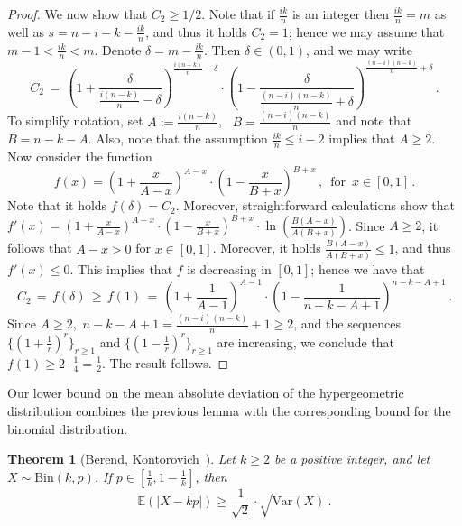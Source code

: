 \documentclass[10pt]{article}
\theoremstyle{plain}
\newtheorem{theorem}{Theorem}[section]
\theoremstyle{definition}
\theoremstyle{remark}
\newcommand{\Exp}{\mathbb{E}}
\begin{document}
\begin{proof}
We now show  that $C_2\ge 1/2$. 
Note that if $\frac{ik}{n}$ is an integer then    $\frac{ik}{n}=m$ 
as well as $s = n-i-k-\frac{ik}{n}$, and thus it holds  $C_2=1$; hence we may  assume that $m-1<\frac{ik}{n}<m$. Denote $\delta= m-\frac{ik}{n}$. Then $\delta\in (0,1)$, and we may write  
\[
C_2 \,=\, \left(1+\frac{\delta}{\frac{i(n-k)}{n}-\delta}\right)^{\frac{i(n-k)}{n}-\delta}\cdot\left(1-\frac{\delta}{\frac{(n-i)(n-k)}{n}+\delta}\right)^{\frac{(n-i)(n-k)}{n}+\delta} \, .
\]
To simplify notation,  set $A:=\frac{i(n-k)}{n}$, \, $B=\frac{(n-i)(n-k)}{n}$ and note that $B=n-k-A$. Also, note that the assumption $\frac{ik}{n}\le i-2$ implies that $A\ge 2$. 
Now consider the function  
\[
f(x)=\left(1+\frac{x}{A-x}\right)^{A-x}\cdot\left(1-\frac{x}{B+x}\right)^{B+x}\, , \, \text{ for } \, x\in [0,1] \, .
\]
Note that it holds $f(\delta)=C_2$. 
Moreover, straightforward calculations show that   
$f'(x)=\left(1+\frac{x}{A-x}\right)^{A-x}\cdot\left(1-\frac{x}{B+x}\right)^{B+x}\cdot \ln\left(\frac{B(A-x)}{A(B+x)}\right)$. 
Since $A\ge 2$, it follows that $A-x>0$ for $x\in [0,1]$. Moreover, it holds $\frac{B(A-x)}{A(B+x)} \le 1$, and thus $f'(x)\le 0$. 
This implies that $f$ is decreasing in $[0,1]$; hence we have that  
\[
C_2 \,=\, f(\delta) \,\ge\, f(1) \,=\, \left(1 +\frac{1}{A-1}\right)^{A-1}\cdot\left(1 - \frac{1}{n-k-A+1}\right)^{n-k-A+1} \, . 
\]
Since $A\ge 2$,\, $n-k-A +1 = \frac{(n-i)(n-k)}{n}+1\ge 2$, and the sequences $\{\left( 1+\frac{1}{r}\right)^r\}_{r\ge 1}$ and $\{\left(1-\frac{1}{r}\right)^r\}_{r\ge 1}$ are increasing,  
we conclude that $f(1) \ge 2\cdot \frac{1}{4} =\frac{1}{2}$. The result follows. 
\end{proof}









Our lower bound on the mean absolute deviation of the hypergeometric distribution combines the previous lemma with the corresponding bound for the binomial distribution. 

\begin{theorem}[Berend, Kontorovich~\cite{Berend_Kontorovich}]
\label{BK_Lemma}
Let $k\ge 2$ be a positive integer, and let $X\sim \text{Bin}(k,p)$. If $p\in [\frac{1}{k}, 1- \frac{1}{k}]$, then 
\[
\Exp(|X-kp|) \ge \frac{1}{\sqrt{2}}\cdot\sqrt{\text{Var}(X)} \, .
\]
\end{theorem}
\end{document}

